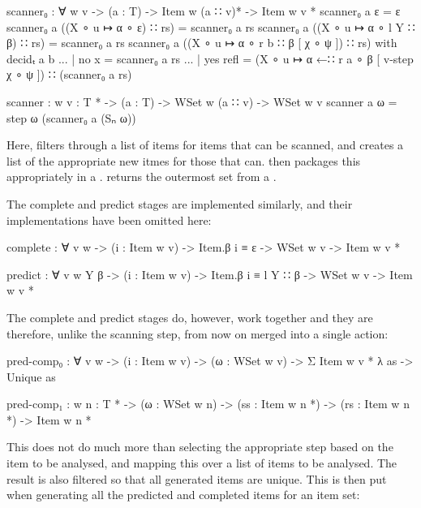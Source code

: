 		\begin{code}
	
			scanner₀ : ∀ {w v} ->
			  (a : T) ->
			  Item w (a ∷ v)* ->
			  Item w v *
			scanner₀ a ε = ε
			scanner₀ a ((X ∘ u ↦ α ∘ ε) ∷ rs) = scanner₀ a rs
			scanner₀ a ((X ∘ u ↦ α ∘ l Y ∷ β) ∷ rs) = scanner₀ a rs
			scanner₀ a ((X ∘ u ↦ α ∘ r b ∷ β [ χ ∘ ψ ]) ∷ rs) with decidₜ a b
			... | no x = scanner₀ a rs
			... | yes refl = 
			  (X ∘ u ↦ α ←∷ r a ∘ β [ v-step χ ∘ ψ ]) ∷ (scanner₀ a rs)
			
			scanner : {w v : T *} ->
			  (a : T) ->
			  WSet w (a ∷ v) ->
			  WSet w v
			scanner a ω = step ω (scanner₀ a (Sₙ ω))
		
		\end{code}
		
		Here,  filters through a list of items for items
		that can be scanned, and creates a list of the appropriate new itmes
		for those that can.  then packages this appropriately
		in a .  returns the outermost set from a
		.
		
		The complete and predict stages are implemented similarly, and their 
		implementations have been omitted here:
		
		\begin{code}
			
			complete : ∀ {v w} -> (i : Item w v) -> Item.β i ≡ ε ->
			  WSet w v -> Item w v *
		
			predict : ∀ {v w Y β} -> (i : Item w v) -> Item.β i ≡ l Y ∷ β ->
			  WSet w v -> Item w v *

		\end{code}
		
 		The complete and predict stages do, however, work together and they are
 		therefore, unlike the scanning step, from now on merged into a single
 		action:
 		
		\begin{code}
			
			pred-comp₀ : ∀ {v w} ->
			  (i : Item w v) ->
			  (ω : WSet w v) ->
			  Σ {Item w v *} λ as -> Unique as
			
			pred-comp₁ : {w n : T *} -> (ω : WSet w n) ->
			  (ss : Item w n *) -> (rs : Item w n *) -> Item w n *
		
		\end{code}
		
		This does not do much more than selecting the appropriate step based on
		the item to be analysed, and mapping this over a list of items to be 
		analysed. The result is also filtered so that all generated items are 
		unique. This is then put when generating all the predicted and 
		completed items for an item set:
		
